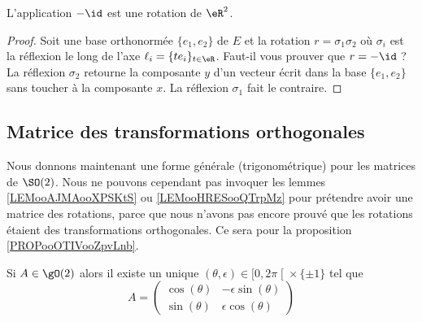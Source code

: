 \begin{lemma}       \label{LEMooMIJXooCjiQqP}
	L'application \( -\id\) est une rotation de \( \eR^2\).
\end{lemma}

\begin{proof}
	Soit une base orthonormée \( \{ e_1,e_2 \}\) de \( E\) et la rotation \( r=\sigma_1\sigma_2\) où \( \sigma_i\) est la réflexion le long de l'axe \( \ell_i=\{ te_i \}_{t\in \eR}\). Faut-il vous prouver que \( r=-\id\) ? La réflexion \( \sigma_2\) retourne la composante \( y\) d'un vecteur écrit dans la base \( \{ e_1,e_2 \}\) sans toucher à la composante \( x\). La réflexion \( \sigma_1\) fait le contraire.
\end{proof}

\subsection{Matrice des transformations orthogonales}

Nous donnons maintenant une forme générale (trigonométrique) pour les matrices de \( \SO(2)\). Nous ne pouvons cependant pas invoquer les lemmes \ref{LEMooAJMAooXPSKtS} ou \ref{LEMooHRESooQTrpMz} pour prétendre avoir une matrice des rotations, parce que nous n'avons pas encore prouvé que les rotations étaient des transformations orthogonales. Ce sera pour la proposition \ref{PROPooOTIVooZpvLnb}.

\begin{lemma}       \label{LEMooAJMAooXPSKtS}
	Si \( A\in \gO(2)\) alors il existe un unique \( (\theta,\epsilon)\in \mathopen[ 0 , 2\pi \mathclose[\times \{ \pm 1 \}\) tel que
	\begin{equation}
		A=\begin{pmatrix}
			\cos(\theta) & -\epsilon\sin(\theta) \\
			\sin(\theta) & \epsilon\cos(\theta)
		\end{pmatrix}
	\end{equation}
\end{lemma}

